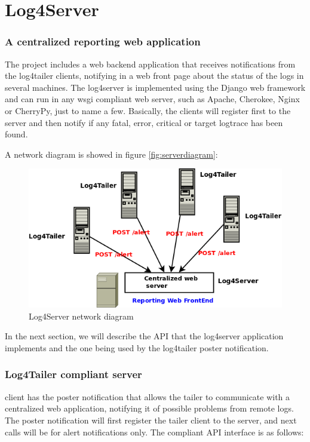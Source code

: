 \part{Log4Server}

\section{A centralized reporting web application}
The \logftailer{} project includes a web backend application that receives notifications 
from the log4tailer clients, notifying in a web front page about the status of the logs 
in several machines. The log4server is implemented using the Django web framework and can run 
in any wsgi compliant web server, such as Apache, Cherokee, Nginx or CherryPy, just to name 
a few. Basically, the clients will register first to the server and then notify if any fatal, 
error, critical or target logtrace has been found. 

A network diagram is showed in figure \autoref{fig:serverdiagram}:

\begin{figure}[hb]
\centering
\includegraphics[scale=0.50]{serverdiagram.png}
\caption{Log4Server network diagram}\label{fig:serverdiagram}
\end{figure}


In the next section, we will describe the API that the log4server application implements and the 
one being used by the log4tailer poster notification.

\section{Log4Tailer compliant server}
\logftailer{} client has the poster notification that allows the tailer to communicate 
with a centralized web application, notifying it of possible problems from remote logs. 
The poster notification will first register the tailer client to the server, and next 
calls will be for alert notifications only. The compliant API interface is as follows:

